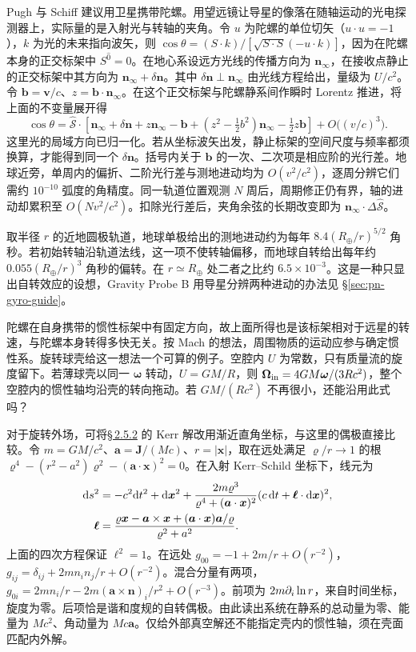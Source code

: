 Pugh 与 Schiff 建议用卫星携带陀螺。用望远镜让导星的像落在随轴运动的光电探测器上，实际量的是入射光与转轴的夹角。令 $u$ 为陀螺的单位切矢（$u\cdot u=-1$），$k$ 为光的未来指向波矢，则 $\cos\theta=(S\cdot k)/[\sqrt{S\cdot S}(-u\cdot k)]$，因为在陀螺本身的正交标架中 $S^{\hat0}=0$。在地心系设远方光线的传播方向为 $\bm n_\infty$，在接收点静止的正交标架中其方向为 $\bm n_\infty+\delta\bm n$。其中 $\delta\bm n\perp\bm n_\infty$ 由光线方程给出，量级为 $U/c^2$。令 $\bm b=\bm v/c$、$z=\bm b\cdot\bm n_\infty$。在这个正交标架与陀螺静系间作瞬时 Lorentz 推进，将上面的不变量展开得
\[
 \cos\theta=\hat{\bm{\mathcal S}}\cdot\!
 \left[\bm n_\infty+\delta\bm n
       +z\bm n_\infty-\bm b+
       (z^2-\tfrac12 b^2)\bm n_\infty-\tfrac12 z\bm b\right]
 + O\bigl((v/c)^3\bigr).
\]
这里光的局域方向已归一化。若从坐标波矢出发，静止标架的空间尺度与频率都须换算，才能得到同一个 $\delta\bm n$。括号内关于 $\bm b$ 的一次、二次项是相应阶的光行差。地球近旁，单周内的偏折、二阶光行差与测地进动均为 $O(v^2/c^2)$，逐周分辨它们需约 $10^{-10}$ 弧度的角精度。同一轨道位置观测 $N$ 周后，周期修正仍有界，轴的进动却累积至 $O(Nv^2/c^2)$。扣除光行差后，夹角余弦的长期改变即为 $\bm n_\infty\cdot\Delta\hat{\bm{\mathcal S}}$。

取半径 $r$ 的近地圆极轨道，地球单极给出的测地进动约为每年 $8.4(R_\oplus/r)^{5/2}$ 角秒。若初始转轴沿轨道法线，这一项不使转轴偏移，而地球自转给出每年约 $0.055(R_\oplus/r)^3$ 角秒的偏转。在 $r\simeq R_\oplus$ 处二者之比约 $6.5\times10^{-3}$。这是一种只显出自转效应的设想，Gravity Probe B 用导星分辨两种进动的办法见 \S\ref{sec:pn-gyro-guide}。

陀螺在自身携带的惯性标架中有固定方向，故上面所得也是该标架相对于远星的转速，与陀螺本身转得多快无关。按 Mach 的想法，周围物质的运动应参与确定惯性系。旋转球壳给这一想法一个可算的例子。空腔内 $U$ 为常数，只有质量流的旋度留下。若薄球壳以同一 $\bm\omega$ 转动，$U=GM/R$，则 $\bm\Omega_{\rm in}=4GM\bm\omega/(3Rc^2)$，整个空腔内的惯性轴均沿壳的转向拖动。若 $GM/(Rc^2)$ 不再很小，还能沿用此式吗？

对于旋转外场，可将\hyperlink{subsection.2.5.2}{\S\,2.5.2} 的 Kerr 解改用渐近直角坐标，与这里的偶极直接比较。令 $m=GM/c^2$、$\bm a=\bm J/(Mc)$、$r=|\bm x|$，取在远处满足 $\varrho/r\to1$ 的根 $\varrho^4-(r^2-a^2)\varrho^2-(\bm a\cdot\bm x)^2=0$。在入射 Kerr--Schild 坐标下，线元为
\begin{align*}
 \dd s^2&=-c^2\dd t^2+\dd\bm x^2+
  \frac{2m\varrho^3}{\varrho^4+(\bm a\cdot\bm x)^2}
  (c\,\dd t+\bm\ell\cdot\dd\bm x)^2,\\
 \bm\ell&=\frac{\varrho\bm x-\bm a\times\bm x+
 (\bm a\cdot\bm x)\bm a/\varrho}{\varrho^2+a^2}.
\end{align*}
上面的四次方程保证 $\bm\ell^2=1$。在远处 $g_{00}=-1+2m/r+O(r^{-2})$，$g_{ij}=\delta_{ij}+2mn_i n_j/r+O(r^{-2})$。混合分量有两项，$g_{0i}=2mn_i/r-2m(\bm a\times\bm n)_i/r^2+O(r^{-3})$。前项为 $2m\partial_i\ln r$，来自时间坐标，旋度为零。后项恰是谐和度规的自转偶极。由此读出系统在静系的总动量为零、能量为 $Mc^2$、角动量为 $Mc\bm a$。仅给外部真空解还不能指定壳内的惯性轴，须在壳面匹配内外解。


